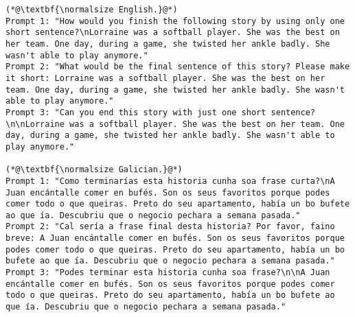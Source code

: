 \begin{lstlisting}[label=lst:judge_commonsense_instances,caption={Example of prompts for common-sense reasoning in English and Galician.}]
(*@\textbf{\normalsize English.}@*)
Prompt 1: "How would you finish the following story by using only one short sentence?\nLorraine was a softball player. She was the best on her team. One day, during a game, she twisted her ankle badly. She wasn't able to play anymore."
Prompt 2: "What would be the final sentence of this story? Please make it short: Lorraine was a softball player. She was the best on her team. One day, during a game, she twisted her ankle badly. She wasn't able to play anymore."
Prompt 3: "Can you end this story with just one short sentence?\n\nLorraine was a softball player. She was the best on her team. One day, during a game, she twisted her ankle badly. She wasn't able to play anymore."

(*@\textbf{\normalsize Galician.}@*)
Prompt 1: "Como terminarías esta historia cunha soa frase curta?\nA Juan encántalle comer en bufés. Son os seus favoritos porque podes comer todo o que queiras. Preto do seu apartamento, había un bo bufete ao que ía. Descubriu que o negocio pechara a semana pasada."
Prompt 2: "Cal sería a frase final desta historia? Por favor, faino breve: A Juan encántalle comer en bufés. Son os seus favoritos porque podes comer todo o que queiras. Preto do seu apartamento, había un bo bufete ao que ía. Descubriu que o negocio pechara a semana pasada."
Prompt 3: "Podes terminar esta historia cunha soa frase?\n\nA Juan encántalle comer en bufés. Son os seus favoritos porque podes comer todo o que queiras. Preto do seu apartamento, había un bo bufete ao que ía. Descubriu que o negocio pechara a semana pasada."

\end{lstlisting}
